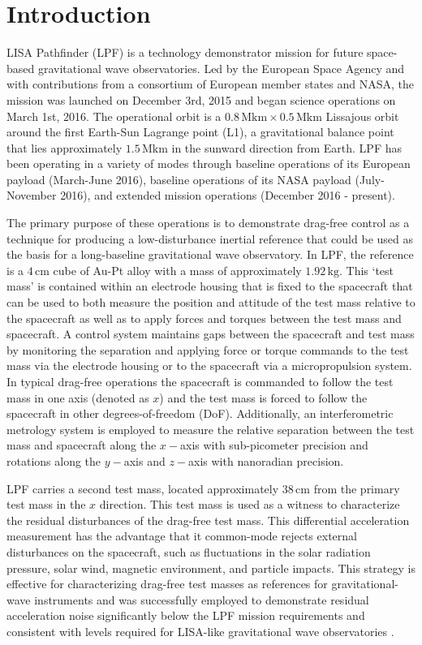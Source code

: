 \documentclass[a4paper]{jpconf}
\begin{document}
\section{Introduction}
\label{sec:intro}
LISA Pathfinder (LPF) \cite{LPF_LISAX}is a technology demonstrator mission for future space-based gravitational wave observatories. Led by the European Space Agency and with contributions from a consortium of European member states and NASA, the mission was launched on December 3rd, 2015 and began science operations on March 1st, 2016. The operational orbit is a $0.8\,\textrm{Mkm} \times 0.5\,\textrm{Mkm}$ Lissajous orbit around the first Earth-Sun Lagrange point (L1), a gravitational balance point that lies approximately $1.5\,\textrm{Mkm}$ in the sunward direction from Earth. LPF has been operating in a variety of modes through baseline operations of its European payload (March-June 2016), baseline operations of its NASA payload (July-November 2016), and extended mission operations (December 2016 - present).
\par
The primary purpose of these operations is to demonstrate drag-free control as a technique for producing a low-disturbance inertial reference that could be used as the basis for a long-baseline gravitational wave observatory. In LPF, the reference is a $4\,\textrm{cm}$ cube of Au-Pt alloy with a mass of approximately $1.92\,\textrm{kg}$. This `test mass' is contained within an electrode housing that is fixed to the spacecraft that can be used to both measure the position and attitude of the test mass relative to the spacecraft as well as to apply forces and torques between the test mass and spacecraft. A control system maintains gaps between the spacecraft and test mass by monitoring the separation and applying force or torque commands to the test mass via the electrode housing or to the spacecraft via a micropropulsion system. In typical drag-free operations the spacecraft is commanded to follow the test mass in one axis (denoted as $x$) and the test mass is forced to follow the spacecraft in other degrees-of-freedom (DoF). Additionally, an interferometric metrology system is employed to measure the relative separation between the test mass and spacecraft along the $x-$axis with sub-picometer precision and rotations along the $y-$axis and $z-$axis with nanoradian precision.
\par
LPF carries a second test mass, located approximately $38\,\textrm{cm}$ from the primary test mass in the $x$ direction. This test mass is used as a witness to characterize the residual disturbances of the drag-free test mass. This differential acceleration measurement has the advantage that it common-mode rejects external disturbances on the spacecraft, such as fluctuations in the solar radiation pressure, solar wind, magnetic environment, and particle impacts. This strategy is effective for characterizing drag-free test masses as references for gravitational-wave instruments and was successfully employed to demonstrate residual acceleration noise significantly below the LPF mission requirements and consistent with levels required for LISA-like gravitational wave observatories \cite{LPF_PRL}.
\end{document}
